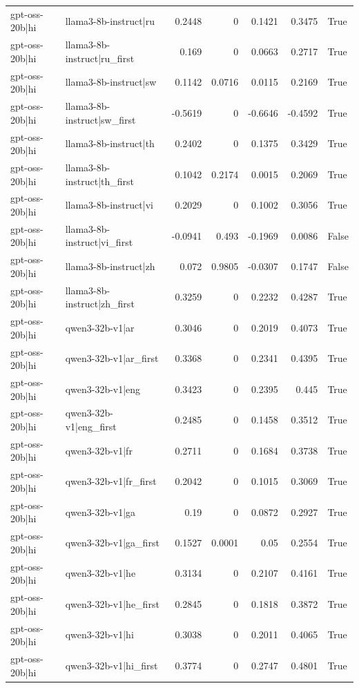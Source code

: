 \begin{table}
\begin{tabular}{l l r r r r l}
gpt-oss-20b|hi & llama3-8b-instruct|ru & 0.2448 & 0 & 0.1421 & 0.3475 & True \\
gpt-oss-20b|hi & llama3-8b-instruct|ru_first & 0.169 & 0 & 0.0663 & 0.2717 & True \\
gpt-oss-20b|hi & llama3-8b-instruct|sw & 0.1142 & 0.0716 & 0.0115 & 0.2169 & True \\
gpt-oss-20b|hi & llama3-8b-instruct|sw_first & -0.5619 & 0 & -0.6646 & -0.4592 & True \\
gpt-oss-20b|hi & llama3-8b-instruct|th & 0.2402 & 0 & 0.1375 & 0.3429 & True \\
gpt-oss-20b|hi & llama3-8b-instruct|th_first & 0.1042 & 0.2174 & 0.0015 & 0.2069 & True \\
gpt-oss-20b|hi & llama3-8b-instruct|vi & 0.2029 & 0 & 0.1002 & 0.3056 & True \\
gpt-oss-20b|hi & llama3-8b-instruct|vi_first & -0.0941 & 0.493 & -0.1969 & 0.0086 & False \\
gpt-oss-20b|hi & llama3-8b-instruct|zh & 0.072 & 0.9805 & -0.0307 & 0.1747 & False \\
gpt-oss-20b|hi & llama3-8b-instruct|zh_first & 0.3259 & 0 & 0.2232 & 0.4287 & True \\
gpt-oss-20b|hi & qwen3-32b-v1|ar & 0.3046 & 0 & 0.2019 & 0.4073 & True \\
gpt-oss-20b|hi & qwen3-32b-v1|ar_first & 0.3368 & 0 & 0.2341 & 0.4395 & True \\
gpt-oss-20b|hi & qwen3-32b-v1|eng & 0.3423 & 0 & 0.2395 & 0.445 & True \\
gpt-oss-20b|hi & qwen3-32b-v1|eng_first & 0.2485 & 0 & 0.1458 & 0.3512 & True \\
gpt-oss-20b|hi & qwen3-32b-v1|fr & 0.2711 & 0 & 0.1684 & 0.3738 & True \\
gpt-oss-20b|hi & qwen3-32b-v1|fr_first & 0.2042 & 0 & 0.1015 & 0.3069 & True \\
gpt-oss-20b|hi & qwen3-32b-v1|ga & 0.19 & 0 & 0.0872 & 0.2927 & True \\
gpt-oss-20b|hi & qwen3-32b-v1|ga_first & 0.1527 & 0.0001 & 0.05 & 0.2554 & True \\
gpt-oss-20b|hi & qwen3-32b-v1|he & 0.3134 & 0 & 0.2107 & 0.4161 & True \\
gpt-oss-20b|hi & qwen3-32b-v1|he_first & 0.2845 & 0 & 0.1818 & 0.3872 & True \\
gpt-oss-20b|hi & qwen3-32b-v1|hi & 0.3038 & 0 & 0.2011 & 0.4065 & True \\
gpt-oss-20b|hi & qwen3-32b-v1|hi_first & 0.3774 & 0 & 0.2747 & 0.4801 & True \\

\end{tabular}
\end{table}
